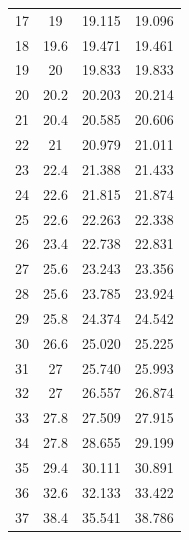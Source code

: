 \begin{table}[H]
\begin{tabular}{cccc}
    17         & 19                          & 19.115                & 19.096                 \\
    18         & 19.6                        & 19.471                & 19.461                 \\
    19         & 20                          & 19.833                & 19.833                 \\
    20         & 20.2                        & 20.203                & 20.214                 \\
    21         & 20.4                        & 20.585                & 20.606                 \\
    22         & 21                          & 20.979                & 21.011                 \\
    23         & 22.4                        & 21.388                & 21.433                 \\
    24         & 22.6                        & 21.815                & 21.874                 \\
    25         & 22.6                        & 22.263                & 22.338                 \\
    26         & 23.4                        & 22.738                & 22.831                 \\
    27         & 25.6                        & 23.243                & 23.356                 \\
    28         & 25.6                        & 23.785                & 23.924                 \\
    29         & 25.8                        & 24.374                & 24.542                 \\
    30         & 26.6                        & 25.020                & 25.225                 \\
    31         & 27                          & 25.740                & 25.993                 \\
    32         & 27                          & 26.557                & 26.874                 \\
    33         & 27.8                        & 27.509                & 27.915                 \\
    34         & 27.8                        & 28.655                & 29.199                 \\
    35         & 29.4                        & 30.111                & 30.891                 \\
    36         & 32.6                        & 32.133                & 33.422                 \\
    37         & 38.4                        & 35.541                & 38.786          \\
    \bottomrule      
    \end{tabular}
    \end{table}

